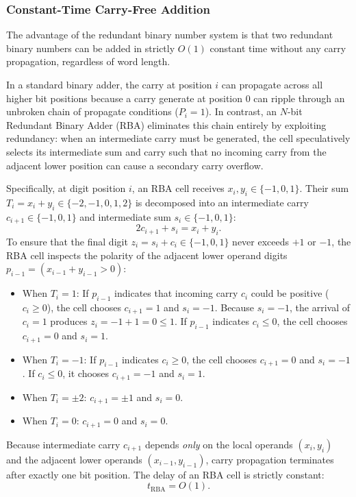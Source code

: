 \subsubsection{Constant-Time Carry-Free Addition}
The advantage of the redundant binary number system is that two redundant binary numbers can be added in strictly $O(1)$ constant time without any carry propagation, regardless of word length.

In a standard binary adder, the carry at position $i$ can propagate across all higher bit positions because a carry generate at position 0 can ripple through an unbroken chain of propagate conditions ($P_i = 1$). In contrast, an $N$-bit Redundant Binary Adder (RBA) eliminates this chain entirely by exploiting redundancy: when an intermediate carry must be generated, the cell speculatively selects its intermediate sum and carry such that no incoming carry from the adjacent lower position can cause a secondary carry overflow.

Specifically, at digit position $i$, an RBA cell receives $x_i, y_i \in \{-1, 0, 1\}$. Their sum $T_i = x_i + y_i \in \{-2, -1, 0, 1, 2\}$ is decomposed into an intermediate carry $c_{i+1} \in \{-1, 0, 1\}$ and intermediate sum $s_i \in \{-1, 0, 1\}$:
\begin{equation}
2 c_{i+1} + s_i = x_i + y_i.
\end{equation}
To ensure that the final digit $z_i = s_i + c_i \in \{-1, 0, 1\}$ never exceeds $+1$ or $-1$, the RBA cell inspects the polarity of the adjacent lower operand digits $p_{i-1} = (x_{i-1} + y_{i-1} > 0)$:
\begin{itemize}
    \item When $T_i = 1$: If $p_{i-1}$ indicates that incoming carry $c_i$ could be positive ($c_i \ge 0$), the cell chooses $c_{i+1} = 1$ and $s_i = -1$. Because $s_i = -1$, the arrival of $c_i = 1$ produces $z_i = -1 + 1 = 0 \le 1$. If $p_{i-1}$ indicates $c_i \le 0$, the cell chooses $c_{i+1} = 0$ and $s_i = 1$.
    \item When $T_i = -1$: If $p_{i-1}$ indicates $c_i \ge 0$, the cell chooses $c_{i+1} = 0$ and $s_i = -1$. If $c_i \le 0$, it chooses $c_{i+1} = -1$ and $s_i = 1$.
    \item When $T_i = \pm 2$: $c_{i+1} = \pm 1$ and $s_i = 0$.
    \item When $T_i = 0$: $c_{i+1} = 0$ and $s_i = 0$.
\end{itemize}
Because intermediate carry $c_{i+1}$ depends \textit{only} on the local operands $(x_i, y_i)$ and the adjacent lower operands $(x_{i-1}, y_{i-1})$, carry propagation terminates after exactly one bit position. The delay of an RBA cell is strictly constant:
\begin{equation}
t_{\text{RBA}} = O(1).
\end{equation}

